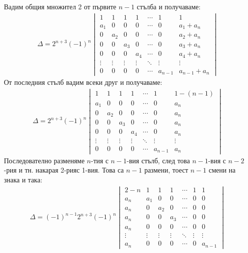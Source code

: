 \documentclass[a4paper, 12pt, oneside]{article}
\begin{document}
Вадим общия множител 2 от първите \(n - 1\) стълба и получаваме:
\begin{align*}
\Delta = 2^{n + 3}(-1)^n\begin{vmatrix}
    1 & 1 & 1 & 1 & \cdots & 1  & 1 \\
    a_1 & 0 & 0 & 0 & \cdots & 0 & a_1 + a_n \\
    0 & a_2 & 0 & 0 & \cdots & 0 & a_2 + a_n \\
    0 & 0 & a_3 & 0 & \cdots & 0 & a_3 + a_n \\
    0 & 0 & 0 & a_4 & \cdots & 0 & a_4 + a_n \\
    \vdots & \vdots & \vdots & \vdots & \ddots & \vdots & \vdots \\
    0 & 0 & 0 & 0 & \cdots & a_{n - 1} & a_{n - 1} + a_n
\end{vmatrix}
\end{align*}
От последния стълб вадим всеки друг и получаваме:
\begin{align*}
\Delta = 2^{n + 3}(-1)^n\begin{vmatrix}
    1 & 1 & 1 & 1 & \cdots & 1  & 1 - (n - 1) \\
    a_1 & 0 & 0 & 0 & \cdots & 0 & a_n \\
    0 & a_2 & 0 & 0 & \cdots & 0 & a_n \\
    0 & 0 & a_3 & 0 & \cdots & 0 & a_n \\
    0 & 0 & 0 & a_4 & \cdots & 0 & a_n \\
    \vdots & \vdots & \vdots & \vdots & \ddots & \vdots & \vdots \\
    0 & 0 & 0 & 0 & \cdots & a_{n - 1} & a_n
\end{vmatrix}
\end{align*}
Последователно разменяме \(n\)-тия с \(n - 1\)-вия стълб, след това \(n - 1\)-вия с \(n - 2\)-рия и тн. накарая 2-рияс 1-вия.
Това са \(n - 1\) размени, тоест \(n - 1\) смени на знака и така:
\begin{align*}
\Delta = (-1)^{n - 1}2^{n + 3}(-1)^n\begin{vmatrix}
    2 - n & 1   & 1   & 1   & \cdots & 1  & 1 \\
    a_n   & a_1 & 0   & 0   & \cdots & 0 & 0 \\
    a_n   & 0   & a_2 & 0   & \cdots & 0 & 0 \\
    a_n   & 0   & 0   & a_3 & \cdots & 0 & 0 \\
    a_n   & 0   & 0   & 0   & \cdots & 0 & 0 \\
    \vdots & \vdots & \vdots & \vdots & \ddots & \vdots & \vdots \\
    a_n & 0 & 0 & 0 & \cdots & 0 & a_{n - 1}
\end{vmatrix}
\end{align*}
\end{document}
